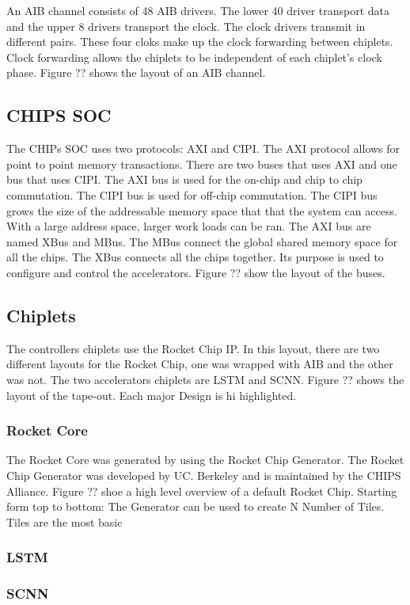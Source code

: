 \documentclass[../main.tex]{subfiles}
\begin{document}
An AIB channel consists of 48 AIB drivers.  The lower 40 driver transport data and the upper 8 drivers transport the clock. The clock drivers transmit in different pairs. These four cloks make up the clock forwarding between chiplets. Clock forwarding allows the chiplets to be independent of each chiplet's clock phase. Figure ?? shows the layout of an AIB channel.

\subsection{CHIPS SOC}
The CHIPs SOC uses two protocols: AXI and CIPI. The AXI protocol allows for point to point memory transactions. There are two buses that uses AXI and one bus that uses CIPI. The AXI bus is used for the on-chip and chip to chip commutation. The CIPI bus is used for off-chip commutation. The CIPI bus grows the size of the addressable memory space that that the system can access. With a large address space, larger work loads can be ran. The AXI bus are named XBus and MBus. The MBus connect the global shared memory space for all the chips. The XBus connects all the chips together. Its purpose is used to configure and control the accelerators. Figure ?? show the layout of the buses.

\subsection{Chiplets}
The controllers chiplets use the Rocket Chip IP\cite{Asanović:EECS-2016-17}. In this layout, there are two different layouts for the Rocket Chip, one was wrapped with AIB and the other was not. The two accelerators chiplets are LSTM and SCNN. Figure ?? shows the layout of the tape-out. Each major Design is hi highlighted. 
\subsubsection{Rocket Core}
The Rocket Core was generated by using the Rocket Chip Generator. The Rocket Chip Generator was developed by UC. Berkeley and is maintained by the CHIPS Alliance. Figure ?? shoe a high level overview of a default Rocket Chip. Starting form top to bottom: The Generator can be used to create N Number of Tiles. Tiles are the most basic 
\subsubsection{LSTM}
\blindtext
\subsubsection{SCNN}
\blindtext
\end{document}
